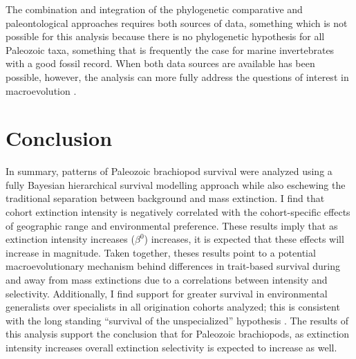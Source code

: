 \documentclass[11pt]{article}
\begin{document}
The combination and integration of the phylogenetic comparative and paleontological approaches requires both sources of data, something which is not possible for this analysis because there is no phylogenetic hypothesis for all Paleozoic taxa, something that is frequently the case for marine invertebrates with a good fossil record. When both data sources are available has been possible, however, the analysis can more fully address the questions of interest in macroevolution \citep{Smits2015,Slater2013a,Slater2015b,Simpson2011,Tomiya2013,Slater2012,Raia2013c,Raia2012f,Harnik2014,Fritz2013a}.

\section*{Conclusion}
In summary, patterns of Paleozoic brachiopod survival were analyzed using a fully Bayesian hierarchical survival modelling approach while also eschewing the traditional separation between background and mass extinction. I find that cohort extinction intensity is negatively correlated with the cohort-specific effects of geographic range and environmental preference. These results imply that as extinction intensity increases (\(\beta^{0}\)) increases, it is expected that these effects will increase in magnitude. Taken together, theses results point to a potential macroevolutionary mechanism behind differences in trait-based survival during and away from mass extinctions due to a correlations between intensity and selectivity. Additionally, I find support for greater survival in environmental generalists over specialists in all origination cohorts analyzed; this is consistent with the long standing ``survival of the unspecialized'' hypothesis \citep{Liow2004a,Liow2007b,Simpson1944,Simpson1953,Smits2015,Nurnberg2015,Nurnberg2013a, Baumiller1993}. The results of this analysis support the conclusion that for Paleozoic brachiopods, as extinction intensity increases overall extinction selectivity is expected to increase as well.






\end{document}
